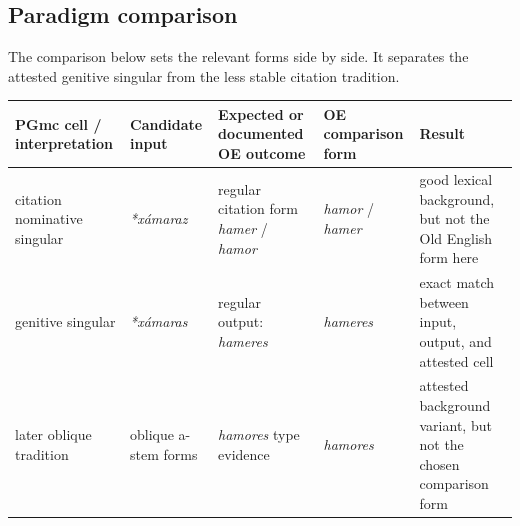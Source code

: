 \documentclass[
  british,
  a4paper,
  openany]{book}
\newcounter{none} %
\begin{document}
\subsection{Paradigm comparison}\label{paradigm-comparison-6}

The comparison below sets the relevant forms side by side. It separates
the attested genitive singular from the less stable citation tradition.

{\def\LTcaptype{none} %
\begin{longtable}[]{@{}
  >{\raggedright\arraybackslash}p{}
  >{\raggedright\arraybackslash}p{}
  >{\raggedright\arraybackslash}p{}
  >{\raggedright\arraybackslash}p{}
  >{\raggedright\arraybackslash}p{}@{}}
\toprule\noalign{}
\begin{minipage}[b]{\linewidth}\raggedright
PGmc cell / interpretation
\end{minipage} & \begin{minipage}[b]{\linewidth}\raggedright
Candidate input
\end{minipage} & \begin{minipage}[b]{\linewidth}\raggedright
Expected or documented OE outcome
\end{minipage} & \begin{minipage}[b]{\linewidth}\raggedright
OE comparison form
\end{minipage} & \begin{minipage}[b]{\linewidth}\raggedright
Result
\end{minipage} \\
\midrule\noalign{}
\endhead
\bottomrule\noalign{}
\endlastfoot
citation nominative singular & {\emph{*xámaraz}} & regular citation form
{\emph{hamer}} / {\emph{hamor}} & {\emph{hamor}} / {\emph{hamer}} & good
lexical background, but not the Old English form here \\
genitive singular & {\emph{*xámaras}} & regular output: {\emph{hameres}}
& {\emph{hameres}} & exact match between input, output, and attested
cell \\
later oblique tradition & oblique a-stem forms & {\emph{hamores}} type
evidence & {\emph{hamores}} & attested background variant, but not the
chosen comparison form \\
\end{longtable}
}
\end{document}
